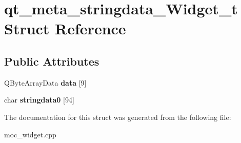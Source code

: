 \hypertarget{structqt__meta__stringdata__Widget__t}{\section{qt\-\_\-meta\-\_\-stringdata\-\_\-\-Widget\-\_\-t Struct Reference}
\label{structqt__meta__stringdata__Widget__t}
}
\subsection*{Public Attributes}
\begin{DoxyCompactItemize}
\item 
\hypertarget{structqt__meta__stringdata__Widget__t_adb457c6767922b075b67514df21769d2}{Q\-Byte\-Array\-Data {\bfseries data} \mbox{[}9\mbox{]}}\label{structqt__meta__stringdata__Widget__t_adb457c6767922b075b67514df21769d2}

\item 
\hypertarget{structqt__meta__stringdata__Widget__t_a87d7c88f0d7c3b1fe1a4423b7e16b3b8}{char {\bfseries stringdata0} \mbox{[}94\mbox{]}}\label{structqt__meta__stringdata__Widget__t_a87d7c88f0d7c3b1fe1a4423b7e16b3b8}

\end{DoxyCompactItemize}


The documentation for this struct was generated from the following file\-:\begin{DoxyCompactItemize}
\item 
moc\-\_\-widget.\-cpp\end{DoxyCompactItemize}
